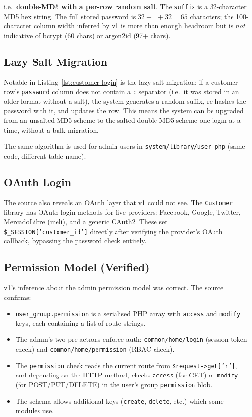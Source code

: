 \documentclass[11pt,a4paper]{article}
\begin{document}
i.e.\ \textbf{double-MD5 with a per-row random salt}. The
\texttt{suffix} is a 32-character MD5 hex string. The full stored
password is $32 + 1 + 32 = 65$ characters; the 100-character column
width inferred by v1 is more than enough headroom but is
\emph{not} indicative of bcrypt (60 chars) or argon2id (97+ chars).

\subsection{Lazy Salt Migration}

Notable in Listing~\ref{lst:customer-login} is the lazy salt
migration: if a customer row's \texttt{password} column does not
contain a \texttt{:} separator (i.e.\ it was stored in an older
format without a salt), the system generates a random suffix,
re-hashes the password with it, and updates the row. This means the
system can be upgraded from an unsalted-MD5 scheme to the
salted-double-MD5 scheme one login at a time, without a bulk
migration.

The same algorithm is used for admin users in
\texttt{system/library/user.php} (same code, different table name).

\subsection{OAuth Login}

The source also reveals an OAuth layer that v1 could not see. The
\texttt{Customer} library has OAuth login methods for five providers:
Facebook, Google, Twitter, MercadoLibre (meli), and a generic OAuth2.
These set \texttt{\$\_SESSION['customer\_id']} directly after
verifying the provider's OAuth callback, bypassing the password
check entirely.

\subsection{Permission Model (Verified)}

v1's inference about the admin permission model was correct. The
source confirms:

\begin{itemize}[leftmargin=1.6em,itemsep=2pt]
  \item \texttt{user\_group.permission} is a serialised PHP array
        with \texttt{access} and \texttt{modify} keys, each
        containing a list of route strings.
  \item The admin's two pre-actions enforce auth:
        \texttt{common/home/login} (session token check) and
        \texttt{common/home/permission} (RBAC check).
  \item The \texttt{permission} check reads the current route from
        \texttt{\$request->get['r']}, and depending on the HTTP
        method, checks \texttt{access} (for GET) or \texttt{modify}
        (for POST/PUT/DELETE) in the user's group
        \texttt{permission} blob.
  \item The schema allows additional keys (\texttt{create},
        \texttt{delete}, etc.) which some modules use.
\end{itemize}
\end{document}
